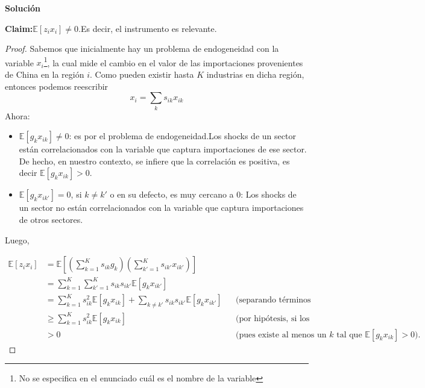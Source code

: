 \documentclass[a4paper, answers, addpoints, 11pt]{exam}
\newenvironment{solucion}{%
  \begin{mdframed}[
    backgroundcolor=blue!5,    %
    linecolor=blue!50,          %
    linewidth=2pt,              %
    leftmargin=10pt,            %
    rightmargin=8pt,           %
    topline=true,              %
    bottomline=true,            %
    roundcorner=10pt,           %
    innerleftmargin=10pt,       %
    innerrightmargin=10pt,      %
    innerbottommargin=10pt,     %
    innertopmargin=10pt         %
  ]%
  \begin{tcolorbox}[colframe=blue!50!black, colback=blue!50, coltitle=white, sharp corners=all, boxrule=1mm, width=\textwidth, halign=left, valign=center, top=0mm, bottom=0mm, left=0mm, right=0mm] \textbf{Solución} \end{tcolorbox} }{\end{mdframed}}
\begin{document}
\begin{enumerate}
\begin{solucion}
    \textbf{Claim:}$\mathbb{E}[z_ix_i]\neq 0$.Es decir, el instrumento es relevante.
    \begin{proof}
    Sabemos que inicialmente hay un problema de endogeneidad con la variable \( x_i \)\footnote{No se especifica en el enunciado cuál es el nombre de la variable}, la cual mide el cambio en el valor de las importaciones
provenientes de China en la región $i$. Como pueden existir hasta $K$ industrias en dicha región, entonces podemos reescribir  $$x_i = \sum_k s_{ik} x_{ik} $$ Ahora:

\begin{itemize}
    \item $ \mathbb{E}[g_k x_{ik}] \neq 0$: es por el problema de endogeneidad.Los shocks de un sector están correlacionados con la variable que captura importaciones de ese sector.  De hecho, en nuestro contexto, se infiere que  la correlación es positiva, es decir $\mathbb{E}[g_k x_{ik}] > 0 $. 

    \item $\mathbb{E}[g_k x_{ik'}] = 0$, si \( k \neq k' \) o en su defecto, es muy cercano a 0: Los shocks de un sector no están correlacionados con la variable que captura importaciones de otros sectores. 
    

\end{itemize}


Luego,

\begin{align*}
\mathbb{E}[z_i x_i] 
&= \mathbb{E} \left[ \left( \sum_{k=1}^K s_{ik} g_k \right) \left( \sum_{k'=1}^K s_{ik'} x_{ik'} \right) \right] \\
&= \sum_{k=1}^K \sum_{k'=1}^K s_{ik} s_{ik'} \mathbb{E}[g_k x_{ik'}] \\
&= \sum_{k=1}^K s_{ik}^2 \mathbb{E}[g_k x_{ik}] + \sum_{k \neq k'} s_{ik} s_{ik'} \mathbb{E}[g_k x_{ik'}] && \text{(separando términos diagonales y cruzados)} \\
&\geq \sum_{k=1}^K s_{ik}^2 \mathbb{E}[g_k x_{ik}] && \text{(por hipótesis, si los cruzados son nulos o pequeños)} \\
&> 0 && \text{(pues existe al menos un } k \text{ tal que } \mathbb{E}[g_k x_{ik}] > 0).
\end{align*}


    \end{proof}
    
    \end{solucion}
    
\end{enumerate}
    
\end{document}
